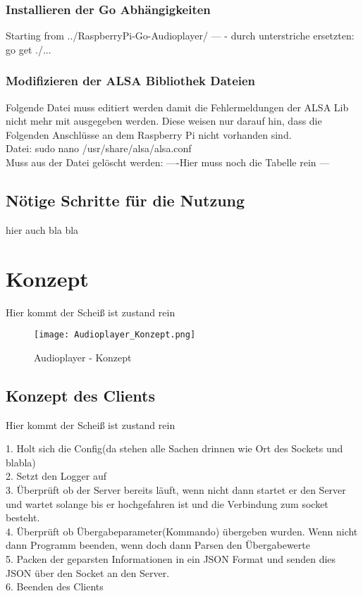 \subsubsection{Installieren der Go Abhängigkeiten}
Starting from ../RaspberryPi-Go-Audioplayer/  --- - durch unterstriche ersetzten: \\
go get ./...  

\subsubsection{Modifizieren der ALSA Bibliothek Dateien}
Folgende Datei muss editiert werden damit die Fehlermeldungen der ALSA Lib nicht mehr mit ausgegeben werden. Diese weisen nur darauf hin, dass die Folgenden Anschlüsse an dem Raspberry Pi nicht vorhanden sind. \\
Datei: sudo nano /usr/share/alsa/alsa.conf \\
Muss aus der Datei gelöscht werden:
----Hier muss noch die Tabelle rein ---

\subsection{Nötige Schritte für die Nutzung}
hier auch bla bla

\section{Konzept}
Hier kommt der Scheiß ist zustand rein
\begin{figure}[h]
	\centering
	\texttt{[image: Audioplayer\_Konzept.png]}
	\caption{Audioplayer - Konzept}
	\label{img:grafik-RaspberryPi3}
\end{figure}
\newline

\subsection{Konzept des Clients}
Hier kommt der Scheiß ist zustand rein

1. Holt sich die Config(da stehen alle Sachen drinnen wie Ort des Sockets und blabla)\\
2. Setzt den Logger auf \\
3. Überprüft ob der Server bereits läuft, wenn nicht dann startet er den Server und wartet solange bis er hochgefahren ist und die Verbindung zum socket besteht. \\
4. Überprüft ob Übergabeparameter(Kommando) übergeben wurden. Wenn nicht dann Programm beenden, wenn doch dann Parsen den Übergabewerte \\
5. Packen der geparsten Informationen in ein JSON Format und senden dies JSON über den Socket an den Server. \\
6. Beenden des Clients \\

